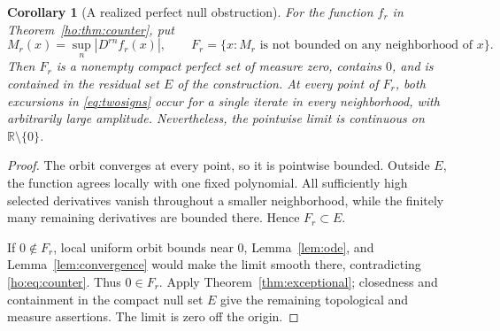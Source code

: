 \documentclass[11pt,reqno]{amsart}
\numberwithin{equation}{section}
\newtheorem{corollary}[theorem]{Corollary}
\theoremstyle{definition}
\theoremstyle{remark}
\newcommand{\R}{\mathbb R}
\begin{document}
\begin{corollary}[A realized perfect null obstruction]\label{cor:realizedbad}
For the function $f_r$ in Theorem~\ref{ho:thm:counter}, put
\[
 M_r(x)=\sup_n|D^{rn}f_r(x)|,\qquad
 F_r=\{x:M_r\text{ is not bounded on any neighborhood of }x\}.
\]
Then $F_r$ is a nonempty compact perfect set of measure zero, contains $0$, and is contained in the residual set $E$ of the construction. At every point of $F_r$, both excursions in \eqref{eq:twosigns} occur for a single iterate in every neighborhood, with arbitrarily large amplitude. Nevertheless, the pointwise limit is continuous on $\R\setminus\{0\}$.
\end{corollary}
\begin{proof}
The orbit converges at every point, so it is pointwise bounded. Outside $E$, the function agrees locally with one fixed polynomial. All sufficiently high selected derivatives vanish throughout a smaller neighborhood, while the finitely many remaining derivatives are bounded there. Hence $F_r\subset E$.

If $0\notin F_r$, local uniform orbit bounds near $0$, Lemma~\ref{lem:ode}, and Lemma~\ref{lem:convergence} would make the limit smooth there, contradicting \eqref{ho:eq:counter}. Thus $0\in F_r$. Apply Theorem~\ref{thm:exceptional}; closedness and containment in the compact null set $E$ give the remaining topological and measure assertions. The limit is zero off the origin.
\end{proof}
\end{document}

